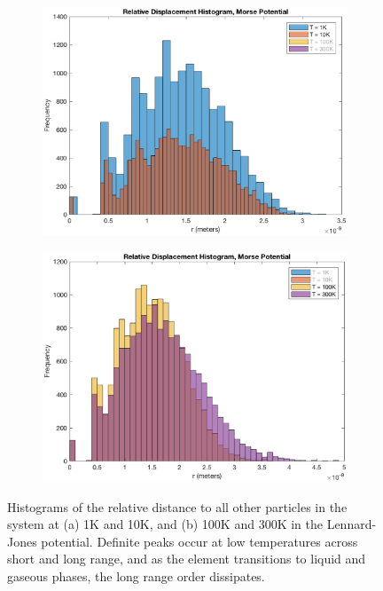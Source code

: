 \documentclass[12pt]{article}
\begin{document}
\begin{figure}[!h]
\begin{subfigure}{0.5\textwidth}
\includegraphics[width=0.9\linewidth]{./finalpics/Mfinalrelativer.eps}
\caption{\label{Mrel}}
\end{subfigure}
\begin{subfigure}{0.5\textwidth}
\includegraphics[width=0.9\linewidth]{./finalpics/MfinalrelativerhighT.eps}
\caption{\label{Mrelhigh}}
\end{subfigure}
\caption{Histograms of the relative distance to all other particles in the system at (a) 1K and 10K, and (b) 100K and 300K in the Lennard-Jones potential.  Definite peaks occur at low temperatures across short and long range, and as the element transitions to liquid and gaseous phases, the long range order dissipates.} 
\end{figure}
\end{document}
